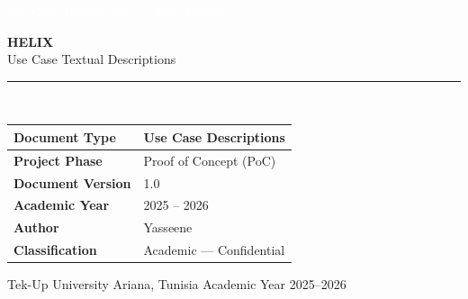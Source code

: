 \documentclass[12pt,a4paper]{report}
\begin{document}

\begin{titlepage}
    \thispagestyle{empty}
    \noindent\colorbox{helixpurple}{%
        \parbox{\dimexpr\textwidth+2\fboxsep\relax}{%
            \vspace{8pt}
            \hspace{8pt}\textcolor{white}{\small\scshape{Use Case Descriptions --- PoC Version}}
            \vspace{8pt}
        }%
    }
    \vspace{3cm}
    \begin{center}
        {\fontsize{52}{60}\selectfont\bfseries\color{helixpurple} HELIX}\\[10pt]
        {\Large\color{textsecondary}Use Case Textual Descriptions}\\[8pt]
        \color{helixborder}\rule{0.65\textwidth}{0.5pt}\\[30pt]
    \end{center}
    \begin{center}
        \begin{tabular}{L{5.2cm} L{7.5cm}}
            \toprule
            \textbf{Document Type}    & Use Case Descriptions \\
            \midrule
            \textbf{Project Phase}    & Proof of Concept (PoC) \\
            \textbf{Document Version} & 1.0 \\
            \textbf{Academic Year}    & 2025 -- 2026 \\
            \textbf{Author}           & Yasseene \\
            \textbf{Classification}   & Academic --- Confidential \\
            \bottomrule
        \end{tabular}
    \end{center}
    \vfill
    \noindent\colorbox{helixgraylight}{%
        \parbox{\dimexpr\textwidth+2\fboxsep\relax}{%
            \vspace{8pt}
            \hspace{8pt}\small\color{textsecondary}
            Tek-Up University \hfill Ariana, Tunisia \hfill Academic Year 2025--2026
            \vspace{8pt}
        }%
    }
\end{titlepage}

{
    \hypersetup{linkcolor=black}
    \tableofcontents
    \thispagestyle{empty}
}
\clearpage
\end{document}

